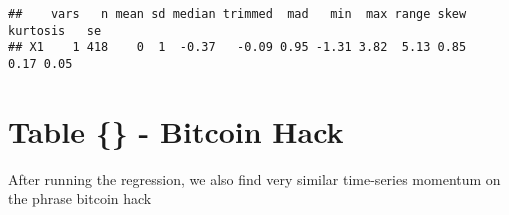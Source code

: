 \documentclass[
]{article}
\newenvironment{Shaded}{\begin{snugshade}}{\end{snugshade}}
\newcommand{\KeywordTok}[1]{\textcolor[rgb]{0.13,0.29,0.53}{\textbf{#1}}}
\newcommand{\NormalTok}[1]{#1}
\newcommand{\OperatorTok}[1]{\textcolor[rgb]{0.81,0.36,0.00}{\textbf{#1}}}
\begin{document}
\begin{Shaded}
\end{Shaded}

\begin{verbatim}
##    vars   n mean sd median trimmed  mad   min  max range skew kurtosis   se
## X1    1 418    0  1  -0.37   -0.09 0.95 -1.31 3.82  5.13 0.85     0.17 0.05
\end{verbatim}

\hypertarget{table---bitcoin-hack}{%
\section{Table \{\} - Bitcoin Hack}\label{table---bitcoin-hack}}

After running the regression, we also find very similar time-series
momentum on the phrase bitcoin hack
\end{document}
